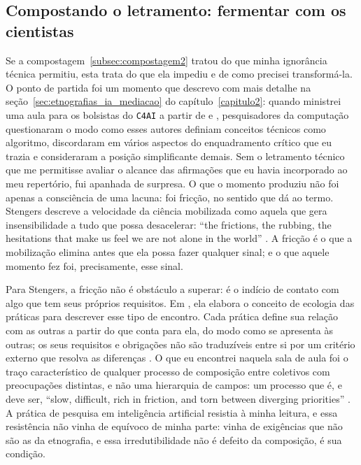 \subsection{Compostando o letramento: fermentar com os cientistas}
\label{subsec:compostagem3}

Se a compostagem~\ref{subsec:compostagem2} tratou do que minha ignorância técnica permitiu, esta trata do que ela impediu e de como precisei transformá-la. O ponto de partida foi um momento que descrevo com mais detalhe na seção~\ref{sec:etnografias_ia_mediacao} do capítulo~\ref{capitulo2}: quando ministrei uma aula para os bolsistas do \texttt{C4AI} a partir de \textcite{pasquinelli2020nooscópio} e \textcite{Crawford2018Anatomy}, pesquisadores da computação questionaram o modo como esses autores definiam conceitos técnicos como algoritmo, discordaram em vários aspectos do enquadramento crítico que eu trazia e consideraram a posição simplificante demais. Sem o letramento técnico que me permitisse avaliar o alcance das afirmações que eu havia incorporado ao meu repertório, fui apanhada de surpresa. O que o momento produziu não foi apenas a consciência de uma lacuna: foi fricção, no sentido que \textcite{stengers2018another} dá ao termo. Stengers descreve a velocidade da ciência mobilizada como aquela que gera insensibilidade a tudo que possa desacelerar: \enquote{the frictions, the rubbing, the hesitations that make us feel we are not alone in the world} \parencite[p.~81]{stengers2018another}. A fricção é o que a mobilização elimina antes que ela possa fazer qualquer sinal; e o que aquele momento fez foi, precisamente, esse sinal.

Para Stengers, a fricção não é obstáculo a superar: é o indício de contato com algo que tem seus próprios requisitos. Em \textcite{stengers2010cosmopolitics1}, ela elabora o conceito de ecologia das práticas para descrever esse tipo de encontro. Cada prática define sua relação com as outras a partir do que conta para ela, do modo como se apresenta às outras; os seus requisitos e obrigações não são traduzíveis entre si por um critério externo que resolva as diferenças \parencite{stengers2010cosmopolitics1}. O que eu encontrei naquela sala de aula foi o traço característico de qualquer processo de composição entre coletivos com preocupações distintas, e não uma hierarquia de campos: um processo que é, e deve ser, \enquote{slow, difficult, rich in friction, and torn between diverging priorities} \parencite[p.~103]{stengers2018another}. A prática de pesquisa em inteligência artificial resistia à minha leitura, e essa resistência não vinha de equívoco de minha parte: vinha de exigências que não são as da etnografia, e essa irredutibilidade não é defeito da composição, é sua condição.

